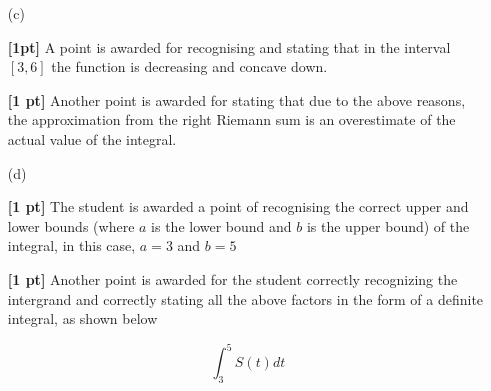\documentclass{article}
\newcommand{\qspace}{\vspace*{1.7em}}
\begin{document}
\begin{enumerate}
        \item[(c)]
        
                \textbf{[1pt]} A point is awarded for recognising and stating that in the interval $[3, 6]$ the function is 
                decreasing and concave down.

                \textbf{[1 pt]} Another point is awarded for stating that due to the above reasons, the approximation from the 
                right Riemann sum is an overestimate of the actual value of the integral. \qspace
        
        \item[(d)] 
        
                \textbf{[1 pt]} The student is awarded a point of recognising the correct upper and lower bounds (where $a$ is the lower bound and $b$ is the upper bound) 
                of the integral, in this case, $a=3$ and $b=5$

                \textbf{[1 pt]} Another point is awarded for the student correctly recognizing the intergrand and correctly
                stating all the above factors in the form of a definite integral, as shown below

                \[
                    \int_3^5 S(t)dt    
                \]
		
    \end{enumerate}
\end{document}

